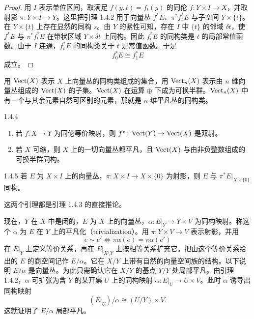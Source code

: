 \begin{proof}
  用 $I$ 表示单位区间，取满足 $f(y,t)=f_t(y)$ 的同伦 $f\colon Y\times I\to X$，并取射影 $\pi\colon Y\times I\to Y$。这里把引理 1.4.2 用于向量丛 $f^*E$、$\pi^*f_t^*E$ 与子空间 $Y\times\{t\}$。在 $Y\times\{t\}$ 上存在显然的同构 $s$。由 $Y$ 的紧性可知，存在 $I$ 中 $\{t\}$ 的邻域 $\delta t$，使 $f^*E$ 与 $\pi^*f_t^*E$ 在带状区域 $Y\times\delta t$ 上同构。因此 $f_t^*E$ 的同构类是 $t$ 的局部常值函数。由于 $I$ 连通，$f_t^*E$ 的同构类关于 $t$ 是常值函数。于是
\[
f_0^*E\cong f_1^*E
\]
成立。
\end{proof}


用 $\operatorname{Vect}(X)$ 表示 $X$ 上向量丛的同构类组成的集合，用 $\operatorname{Vect}_n(X)$ 表示由 $n$ 维向量丛组成的 $\operatorname{Vect}(X)$ 的子集。$\operatorname{Vect}(X)$ 在运算 $\oplus$ 下成为可换半群。$\operatorname{Vect}_n(X)$ 中有一个与其余元素自然可区别的元素，那就是 $n$ 维平凡丛的同构类。

\begin{lemma}{1.4.4}
  \begin{enumerate}[label=(\roman*),leftmargin=2.4em,itemsep=1pt]
  \item 若 $f\colon X\to Y$ 为同伦等价映射，则 $f^*\colon\operatorname{Vect}(Y)\to\operatorname{Vect}(X)$ 是双射。
  \item 若 $X$ 可缩，则 $X$ 上的一切向量丛都平凡，且 $\operatorname{Vect}(X)$ 与由非负整数组成的可换半群同构。
  \end{enumerate}
\end{lemma}

\begin{lemma}{1.4.5}
  若 $E$ 为 $X\times I$ 上的向量丛，$\pi\colon X\times I\to X\times\{0\}$ 为射影，则 $E$ 与 $\pi^*E|_{X\times\{0\}}$ 同构。
\end{lemma}

这两个引理都是引理 1.4.3 的直接推论。

现在，$Y$ 在 $X$ 中是闭的，$E$ 为 $X$ 上的向量丛，$\alpha\colon E|_Y\to Y\times V$ 为同构映射。称这个 $\alpha$ 为 $E$ 在 $Y$ 上的平凡化（trivialization）。用 $\pi\colon Y\times V\to V$ 表示射影，并用
\[
e\sim e'\iff\pi\alpha(e)=\pi\alpha(e')
\]
在 $E|_Y$ 上定义等价关系，再在 $E|_{X\setminus Y}$ 上按相等关系扩充它。把由这个等价关系给出的 $E$ 的商空间记作 $E/\alpha$。它在 $X/Y$ 上带有自然的向量空间族的结构。以下说明 $E/\alpha$ 是向量丛。为此只需确认它在 $X/Y$ 的基点 $Y/Y$ 处局部平凡。由引理 1.4.2，$\alpha$ 可扩张为含 $Y$ 的某开集 $U$ 上的同构映射 $\tilde\alpha\colon E|_U\to U\times V$。此时 $\tilde\alpha$ 诱导出同构映射
\[
(E|_U)/\alpha\cong(U/Y)\times V.
\]
这就证明了 $E/\alpha$ 局部平凡。

